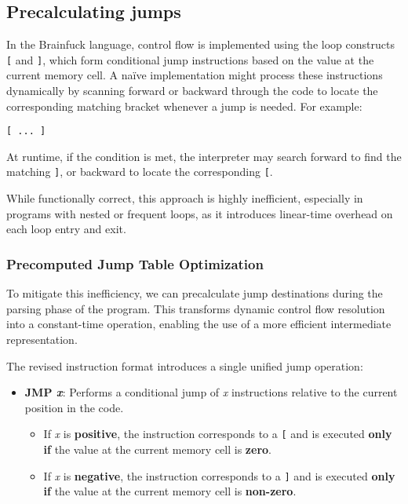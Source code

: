 \subsection{Precalculating jumps}
\label{subsec:ch2sec3sec2}

\par In the Brainfuck language, control flow is implemented using the loop constructs \texttt{[} and \texttt{]}, which form conditional jump instructions based on the value at the current memory cell. A naïve implementation might process these instructions dynamically by scanning forward or backward through the code to locate the corresponding matching bracket whenever a jump is needed. For example:

\begin{verbatim}
[ ... ]
\end{verbatim}

At runtime, if the condition is met, the interpreter may search forward to find the matching \texttt{]}, or backward to locate the corresponding \texttt{[}.

While functionally correct, this approach is highly inefficient, especially in programs with nested or frequent loops, as it introduces linear-time overhead on each loop entry and exit.

\subsubsection*{Precomputed Jump Table Optimization}

To mitigate this inefficiency, we can precalculate jump destinations during the parsing phase of the program. This transforms dynamic control flow resolution into a constant-time operation, enabling the use of a more efficient intermediate representation.

The revised instruction format introduces a single unified jump operation:

\begin{itemize}
    \item \textbf{JMP \textit{x}}: Performs a conditional jump of \textit{x} instructions relative to the current position in the code.
    \begin{itemize}
        \item If \textit{x} is \textbf{positive}, the instruction corresponds to a \texttt{[} and is executed \textbf{only if} the value at the current memory cell is \textbf{zero}.
        \item If \textit{x} is \textbf{negative}, the instruction corresponds to a \texttt{]} and is executed \textbf{only if} the value at the current memory cell is \textbf{non-zero}.
    \end{itemize}
\end{itemize}

